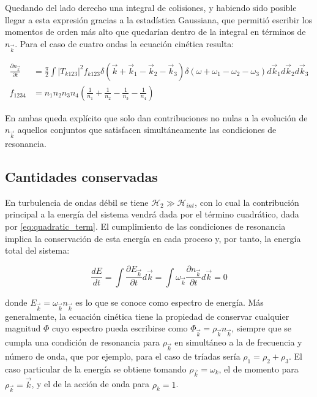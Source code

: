 Quedando del lado derecho una integral de colisiones, y habiendo sido posible llegar a esta expresión gracias a la estadística Gaussiana, que permitió escribir los momentos de orden más alto que quedarían dentro de la integral en términos de $n_{\vec k}$. Para el caso de cuatro ondas la ecuación cinética resulta: %

\begin{equation}
	\begin{split}
		\frac{\partial n_{\vec k}}{\partial t} &= \frac{\pi}{2} \int |T_{k123}|^2 f_{k123} \delta(\vec k + \vec k_1 - \vec k_2 -\vec k_3) \delta(\omega + \omega_1 -\omega_2 - \omega_3) d\vec k_1 d\vec k_2 d\vec k_3 \\
		f_{1234} &= n_1n_2n_3n_4\left(\frac{1}{n_1} + \frac{1}{n_2} - \frac{1}{n_3} - \frac{1}{n_4} \right)
	\end{split}
\end{equation}

En ambas queda explícito que solo dan contribuciones no nulas a la evolución de $n_{\vec k}$ aquellos conjuntos que satisfacen simultáneamente las condiciones de resonancia. 

\subsection{Cantidades conservadas} %

En turbulencia de ondas débil se tiene $\mathcal{H}_2\gg\mathcal{H}_{int}$, con lo cual la contribución principal a la energía del sistema vendrá dada por el término cuadrático, dada por \eqref{eq:quadratic_term}. El cumplimiento de las condiciones de resonancia implica la conservación de 
esta energía en cada proceso y, por tanto, la energía total del sistema: 

\begin{equation}
	\frac{dE}{dt} = \int \frac{\partial E_{\vec k}}{\partial t} d\vec k =\int \omega_{\vec k} \frac{\partial n_{\vec k}}{\partial t} d\vec k=0  
	\label{eq:energy_conservation}  
\end{equation}  

\noindent donde $E_{\vec k}=\omega_{\vec k}n_{\vec k}$ es lo que se conoce como espectro de energía. Más generalmente, la ecuación cinética tiene la propiedad de conservar cualquier magnitud $\Phi$ cuyo espectro pueda escribirse como $\Phi_{\vec k}=\rho_{\vec k}n_{\vec k}$, siempre que se cumpla una condición de resonancia para $\rho_{\vec k}$ en simultáneo a la de frecuencia y número de onda, que por ejemplo, para el caso de tríadas sería $\rho_1=\rho_2+\rho_3$. El caso particular de la energía se obtiene tomando $\rho_{\vec k}=\omega_{k}$, el de momento para $\rho_{\vec k}=\vec k$, y el de la acción de onda para $\rho_{k}=1$. %

